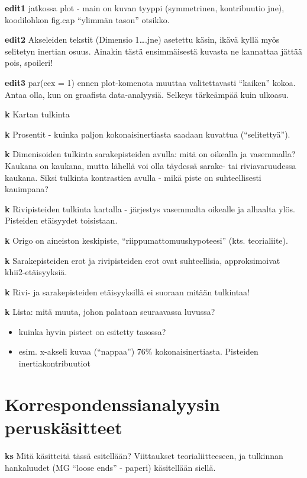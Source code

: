 \documentclass[
  finnish,
]{book}
\providecommand{\tightlist}{%
  \setlength{\itemsep}{0pt}\setlength{\parskip}{0pt}}
\begin{document}
\textbf{edit1} jatkossa plot - main on kuvan tyyppi (symmetrinen, kontribuutio jne),
koodilohkon fig.cap ``ylimmän tason'' otsikko.

\textbf{edit2} Akseleiden tekstit (Dimensio 1\ldots.jne) asetettu käsin, ikävä kyllä myös
selitetyn inertian osuus. Ainakin tästä ensimmäisestä kuvasta ne kannattaa jättää
pois, spoileri!

\textbf{edit3} par(cex = 1) ennen plot-komenota muuttaa valitettavasti ``kaiken'' kokoa.
Antaa olla, kun on graafista data-analyysiä. Selkeys tärkeämpää kuin ulkoasu.

\textbf{k} Kartan tulkinta

\textbf{k} Prosentit - kuinka paljon kokonaisinertiasta saadaan kuvattua (``selitettyä'').

\textbf{k} Dimenisoiden tulkinta sarakepisteiden avulla: mitä on oikealla ja vasemmalla?
Kaukana on kaukana, mutta lähellä voi olla täydessä sarake- tai riviavaruudessa
kaukana. Siksi tulkinta kontrastien avulla - mikä piste on suhteellisesti kauimpana?

\textbf{k} Rivipisteiden tulkinta kartalla - järjestys vasemmalta oikealle ja alhaalta
ylös. Pisteiden etäisyydet toisistaan.

\textbf{k} Origo on aineiston keskipiste, ``riippumattomuushypoteesi'' (kts. teorialiite).

\textbf{k} Sarakepisteiden erot ja rivipisteiden erot ovat suhteellisia, approksimoivat
khii2-etäisyyksiä.

\textbf{k} Rivi- ja sarakepisteiden etäisyyksillä ei suoraan mitään tulkintaa!

\textbf{k} Lista: mitä muuta, johon palataan seuraavassa luvussa?

\begin{itemize}
\tightlist
\item
  kuinka hyvin pisteet on esitetty tasossa?
\item
  esim. x-akseli kuvaa (``nappaa'') 76\% kokonaisinertiasta. Pisteiden
  inertiakontribuutiot
\end{itemize}

\hypertarget{korrespondenssianalyysin-peruskuxe4sitteet}{%
\section{Korrespondenssianalyysin peruskäsitteet}\label{korrespondenssianalyysin-peruskuxe4sitteet}}

\textbf{ks} Mitä käsitteitä tässä esitellään? Viittaukset teorialiitteeseen, ja
tulkinnan hankaluudet (MG ``loose ends'' - paperi) käsitellään siellä.
\end{document}

